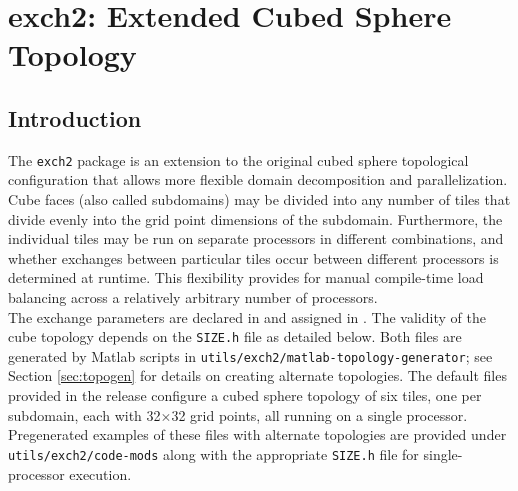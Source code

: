 


\section{exch2: Extended Cubed Sphere \mbox{Topology}}
\label{sec:exch2}


\subsection{Introduction}

The \texttt{exch2} package is an extension to the original cubed
sphere topological configuration that allows more flexible domain
decomposition and parallelization.  Cube faces (also called
subdomains) may be divided into any number of tiles that divide evenly
into the grid point dimensions of the subdomain.  Furthermore, the
individual tiles may be run on separate processors in different
combinations, and whether exchanges between particular tiles occur
between different processors is determined at runtime.  This
flexibility provides for manual compile-time load balancing across a
relatively arbitrary number of processors. \\

The exchange parameters are declared in
and assigned in
. The
validity of the cube topology depends on the \texttt{SIZE.h} file as
detailed below.  Both files are generated by Matlab scripts in
\texttt{utils/exch2/matlab-topology-generator}; see Section
\ref{sec:topogen} for details on creating alternate topologies.  The
default files provided in the release configure a cubed sphere
topology of six tiles, one per subdomain, each with 32$\times$32 grid
points, all running on a single processor.  Pregenerated examples of
these files with alternate topologies are provided under
\texttt{utils/exch2/code-mods} along with the appropriate
\texttt{SIZE.h} file for single-processor execution.

